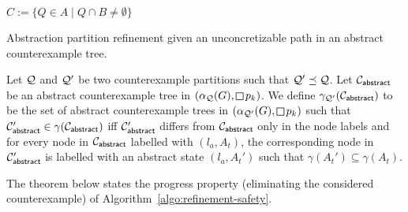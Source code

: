 \begin{algorithm}[h]
{$C := \{ Q\in A \mid Q \cap B \neq \emptyset\}$
} 

\smallskip

\caption{Abstraction partition refinement given an unconcretizable path in an  abstract counterexample tree.}
\label{algo:refinement-safety}
\end{algorithm}

Let $\mathcal{Q}$ and $\mathcal{Q}'$ be two counterexample partitions such that $\mathcal{Q}' \preceq \mathcal{Q}$. Let $\mathcal{C}_{\mathsf{abstract}}$ be an abstract counterexample  tree in $(\alpha_\part(G),\LTLglobally p_k)$. We define $\gamma_{\mathcal{Q}'}(\mathcal{C}_{\mathsf{abstract}})$ to be the set of abstract counterexample trees in $(\alpha_{\part'}(G),\LTLglobally p_k)$ such that $\mathcal{C}'_{\mathsf{abstract}} \in \gamma(\mathcal{C}_{\mathsf{abstract}})$ iff $\mathcal{C}'_{\mathsf{abstract}}$ differs from $\mathcal{C}_{\mathsf{abstract}}$ only in the node labels and for every node in $\mathcal{C}_{\mathsf{abstract}}$ labelled with $(l_a,A_t)$, the corresponding node in $\mathcal{C}'_{\mathsf{abstract}}$ is labelled with an abstract state $(l_a,A_t')$ such that $\gamma(A_t') \subseteq \gamma(A_t)$.
 
The theorem below states the progress property (eliminating the considered counterexample) of Algorithm~\ref{algo:refinement-safety}.

